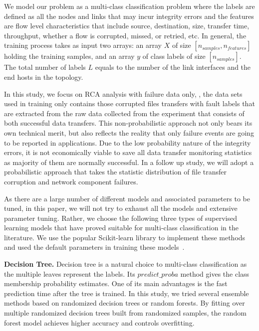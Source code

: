 We model our problem as a multi-class classification problem where the labels are defined as all the nodes and links that may incur integrity errors and the features are flow level characteristics that include source, destination, size, transfer time, throughput, whether a flow is corrupted, missed, or retried, etc. In general, the training process takes as input two arrays: an array $X$ of size $[n_{samples}, n_{features}]$ holding the training samples, and an array $y$ of class labels of size $[n_{samples}]$. The total number of labels $L$ equals to the number of the link interfaces and the end hosts in the topology.

In this study, we focus on RCA analysis with failure data only, \ie, the data sets used in training only contains those corrupted files transfers with fault labels that are extracted from the raw data collected from the experiment that consists of both successful data transfers. This non-probabilistic approach not only bears its own technical merit, but also reflects the reality that only failure events are going to be reported in applications. Due to the low probability nature of the integrity errors, it is not economically viable to save all data transfer monitoring statistics as majority of them are normally successful. In a follow up study, we will adopt a probabilistic approach that takes the statistic distribution of file transfer corruption and network component failures.      

As there are a large number of different models and associated parameters to be tuned, in this paper, we will not try to exhaust all the models and extensive parameter tuning. Rather, we choose the following three types of supervised learning models that have proved suitable for multi-class classification in the literature. We use the popular Scikit-learn library to implement these methods and used the default parameters in training these models~\cite{Scikit:web}. 

{\bf Decision Tree.}  Decision tree is a natural choice to multi-class classification as the multiple leaves represent the labels. Its $predict\_proba$ method gives the class membership probability estimates. One of its main advantages is the fast prediction time after the tree is trained. In this study, we tried several ensemble methods based on randomized decision trees or random forests. By fitting over multiple randomized decision trees built from randomized samples, the random forest model achieves higher accuracy and controls overfitting. 

